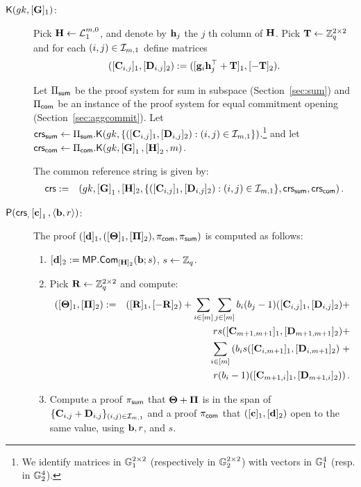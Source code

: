 \begin{description}
\item[{$\mathsf{K}({gk}, [\mathbf{{G}}]_1)$}:] 
Pick $\mathbf{{H}}\gets\mathcal{L}_1^{m,0}$, and denote by $\mathbf{h}_{j}$ the $j$ th column of $\mathbf{{H}}$. Pick $\mathbf{{T}}\gets\mathbb{Z}_q^{2\times 2}$ and for each $(i,j)\in\mathcal{I}_{m,1}$ define matrices
$$([\mathbf{{C}}_{i,j}]_1,[\mathbf{{D}}_{i,j}]_2):=([\mathbf{g}_i\mathbf{h}_j^{\top}+\mathbf{{T}}]_1,[-\mathbf{{T}}]_2).$$

Let $\Pi_{\mathsf{sum}}$ be the proof system for sum in subspace 
(Section~\ref{sec:sum}) and $\Pi_{\mathsf{com}}$
be an instance of the proof system for equal commitment opening (Section~\ref{sec:aggcommit}).
Let
$\mathsf{crs}_{\mathsf{sum}} \gets \Pi_{\mathsf{sum}}.\mathsf{K}({gk}, \{([\mathbf{{C}}_{i,j}]_1,[\mathbf{{D}}_{i,j}]_2):(i,j)\in\mathcal{I}_{m,1}\})$.\footnote{We identify
matrices in $\mathbb{G}_1^{2 \times 2}$ (respectively in $\mathbb{G}_2^{2 \times 2}$) with vectors in $\mathbb{G}_1^{4}$ (resp. in $\mathbb{G}_2^{4}$).} and let $\mathsf{crs}_{\mathsf{com}} \gets \Pi_{\mathsf{com}}.\mathsf{K}({gk}, \left[\mathbf{{G}}\right]_1,\left[\mathbf{{H}}\right]_2,m)$. 

The common reference string is given by:
\begin{eqnarray*}
\mathsf{crs}&:=&\left( gk, \left[\mathbf{{G}}\right]_1,
    [\mathbf{{H}}]_2, \{([\mathbf{{C}}_{i,j}]_1, [\mathbf{{D}}_{i,j}]_2): (i,j) \in \mathcal{I}_{m,1}\},\mathsf{crs}_{\mathsf{sum}},\mathsf{crs}_{\mathsf{com}} \right).
 \end{eqnarray*}
\item[$\mathsf{P}(\mathsf{crs}_, \left[\mathbf{c}\right]_1, \langle \mathbf{b}, r \rangle)$:] The proof $([\mathbf{d}]_1,([\mathbf{{\Theta}}]_1,[\mathbf{{\Pi}}]_2),\pi_{\mathsf{com}},\pi_{\mathsf{sum}})$ is computed as follows:
\begin{enumerate}
\item $[\mathbf{d}]_2:= \mathsf{MP}.\mathsf{Com}_{[\mathbf{{H}}]_2} (\mathbf{b};s)$, $s \gets \mathbb{Z}_q$. 
\item Pick $\mathbf{{R}} \gets \mathbb{Z}_q^{2\times 2}$ and compute:
\begin{eqnarray*}
([\mathbf{{\Theta}}]_1, [\mathbf{{\Pi}}]_2) & := & ([\mathbf{{R}}]_1,[-\mathbf{{R}}]_2)+
\sum_{i\in[m]}\sum_{j\in[m]}b_i(b_j-1)([\mathbf{{C}}_{i,j}]_1,[\mathbf{{D}}_{i,j}]_2)+\\
& &     rs([\mathbf{{C}}_{m+1,m+1}]_1,[\mathbf{{D}}_{m+1,m+1}]_2)+\\
& &
  \sum_{i \in [m]}
 \left(b_i s  ([\mathbf{{C}}_{i,m+1}]_1,[\mathbf{{D}}_{i,m+1}]_2)\right. +\\
& & \left.r(b_i-1) ([\mathbf{{C}}_{m+1,i}]_1,[\mathbf{{D}}_{m+1,i}]_2)\right).
\end{eqnarray*}

\item Compute a proof $\pi_{\mathsf{sum}}$
that $\mathbf{{\Theta}}+\mathbf{{\Pi}}$ is in the span of 
$\{\mathbf{{C}}_{i,j}+\mathbf{{D}}_{i,j}\}_{(i,j)\in\mathcal{I}_{m,1}}$
and a proof $\pi_{\mathsf{com}}$
that
$([\mathbf{c}]_1,[\mathbf{d}]_2)$ open to the same value,
using $\mathbf{b},r$, and $s$. \\
\end{enumerate}


\end{description}
